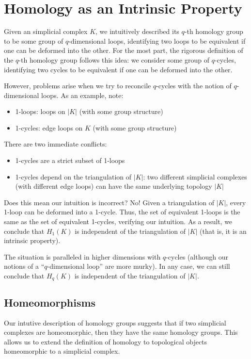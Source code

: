 \section{Homology as an Intrinsic Property}
Given an simplicial complex $K$, we intuitively described its $q$-th homology group to be some group of $q$-dimensional loops, identifying two loops to be equivalent if one can be deformed into the other. For the most part, the rigorous definition of the $q$-th homology group follows this idea: we consider some group of $q$-cycles, identifying two cycles to be equivalent if one can be deformed into the other.

However, problems arise when we try to reconcile $q$-cycles with the notion of $q$-dimensional loops. As an example, note:
\begin{itemize}
    \item 1-loops: loops on $|K|$ (with some group structure)
    \item 1-cycles: edge loops on $K$ (with some group structure)
\end{itemize}
There are two immediate conflicts:
\begin{itemize}
    \item 1-cycles are a strict subset of 1-loops
    \item 1-cycles depend on the triangulation of $|K|$: two different simplicial complexes (with different edge loops) can have the same underlying topology $|K|$
\end{itemize}

Does this mean our intuition is incorrect? No! Given a triangulation of $|K|$, every 1-loop can be deformed into a 1-cycle. Thus, the set of equivalent 1-loops is the same as the set of equivalent 1-cycles, verifying our intuition. As a result, we conclude that $H_1(K)$ is independent of the triangulation of $|K|$ (that is, it is an intrinsic property).

The situation is paralleled in higher dimensions with $q$-cycles (although our notions of a ``$q$-dimensional loop'' are more murky). In any case, we can still conclude that $H_q(K)$ is independent of the triangulation of $|K|$.

\subsection{Homeomorphisms}
Our intutive description of homology groups suggests that if two simplicial complexes are homeomorphic, then they have the same homology groups. This allows us to extend the definition of homology to topological objects homeomorphic to a simplicial complex.